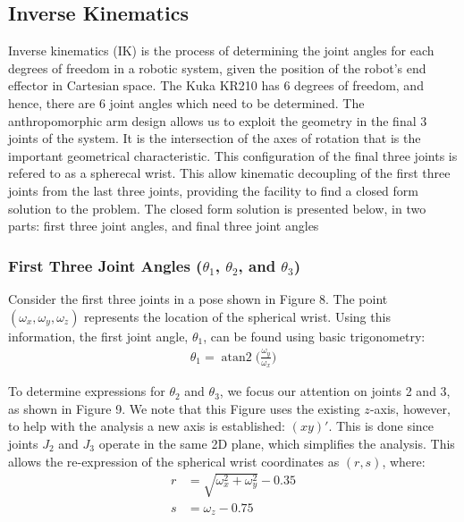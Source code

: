 \documentclass[a4paper]{article}
\DeclareMathOperator{\atantwo}{atan2}
\begin{document}
\subsection{Inverse Kinematics}
Inverse kinematics (IK) is the process of determining the joint angles for each degrees of freedom in a robotic system, given the position of the robot's end effector in Cartesian space. The Kuka KR210 has 6 degrees of freedom, and hence, there are 6 joint angles which need to be determined. The anthropomorphic arm design allows us to exploit the geometry in the final 3 joints of the system. It is the intersection of the axes of rotation that is the important geometrical characteristic. This configuration of the final three joints is refered to as a spherecal wrist. This allow kinematic decoupling of the first three joints from the last three joints, providing the facility to find a closed form solution to the problem. The closed form solution is presented below, in two parts: first three joint angles, and final three joint angles

\subsubsection{First Three Joint Angles ($\theta_1$, $\theta_2$, and $\theta_3$)}
Consider the first three joints in a pose shown in Figure 8. The point $(\omega_x, \omega_y, \omega_z)$ represents the location of the spherical wrist. Using this information, the first joint angle, $\theta_1$, can be found using basic trigonometry:
\begin{align}
\theta_1 = \atantwo \bigg( \frac{\omega_y}{\omega_x} \bigg)
\end{align}

To determine expressions for $\theta_2$ and $\theta_3$, we focus our attention on joints 2 and 3, as shown in Figure 9. We note that this Figure uses the existing $z$-axis, however, to help with the analysis a new axis is established: $(xy)'$. This is done since joints $J_2$ and $J_3$ operate in the same 2D plane, which simplifies the analysis. This allows the re-expression of the spherical wrist coordinates as $(r,s)$, where:
\begin{align}
r &= \sqrt{\omega_x^2 + \omega_y^2} - 0.35\\
s &= \omega_z - 0.75 
\end{align}
\end{document}
